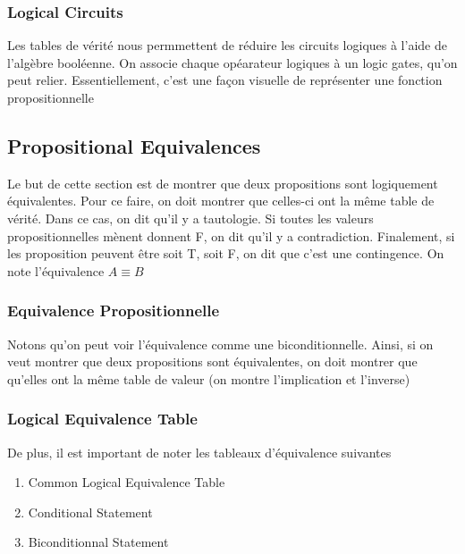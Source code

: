 \documentclass{article}
\begin{document}
\subsubsection{Logical Circuits}

Les tables de vérité nous permmettent de réduire les circuits logiques
à l'aide de l'algèbre booléenne. On associe chaque opéarateur logiques
à un logic gates, qu'on peut relier. Essentiellement, c'est une façon
visuelle de représenter une fonction propositionnelle

\subsection{Propositional Equivalences}

Le but de cette section est de montrer que deux propositions sont logiquement
équivalentes. Pour ce faire, on doit montrer que celles-ci ont la même
table de vérité. Dans ce cas, on dit qu'il y a tautologie. Si toutes les
valeurs propositionnelles mènent donnent F, on dit qu'il y a contradiction.
Finalement, si les proposition peuvent être soit T, soit F, on dit que
c'est une contingence. On note l'équivalence $ A \equiv B $

\subsubsection{Equivalence Propositionnelle}

Notons qu'on peut voir l'équivalence comme une biconditionnelle. Ainsi,
si on veut montrer que deux propositions sont équivalentes, on doit
montrer que qu'elles ont la même table de valeur (on montre l'implication
et l'inverse)\\

\subsubsection{Logical Equivalence Table}

De plus, il est important de noter les tableaux d'équivalence suivantes
\begin{enumerate}
    \item Common Logical Equivalence Table
    \item Conditional Statement
    \item Biconditionnal Statement
\end{enumerate}
\end{document}
